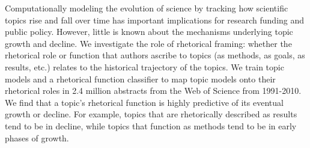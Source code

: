 Computationally modeling the evolution of science by tracking how scientific topics rise and fall over time has important implications for research funding and public policy. However, little is known about the mechanisms underlying topic growth and decline. We investigate the role of rhetorical framing: whether the rhetorical role or function that authors ascribe to topics (as methods, as goals, as results, etc.) relates to the historical trajectory of the topics. We train topic models and a rhetorical function classifier to map topic models onto their rhetorical roles in 2.4 million abstracts from the Web of Science from 1991-2010. We find that a topic's rhetorical function is highly predictive of its eventual growth or decline. For example, topics that are rhetorically described as results tend to be in decline, while topics that function as methods tend to be in early phases of growth.
